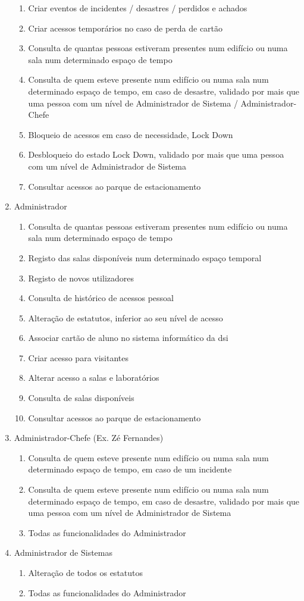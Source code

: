 \documentclass[a4paper]{report}
\begin{document}
\begin{enumerate}
\begin{enumerate}
    \item Criar eventos de incidentes / desastres / perdidos e achados
    \item Criar acessos temporários no caso de perda de cartão
	\item Consulta de quantas pessoas estiveram presentes num edifício ou numa sala num determinado espaço de tempo
    \item Consulta de quem esteve presente num edifício ou numa sala num determinado espaço de tempo, em caso de desastre, validado por mais que uma pessoa com um nível de Administrador de Sistema / Administrador-Chefe
    \item Bloqueio de acessos em caso de necessidade, Lock Down
    \item Desbloqueio do estado Lock Down, validado por mais que uma pessoa com um nível de Administrador de Sistema
    \item Consultar acessos ao parque de estacionamento
	\end{enumerate}
\item Administrador
	\begin{enumerate}
    \item Consulta de quantas pessoas estiveram presentes num edifício ou numa sala num determinado espaço de tempo
    \item Registo das salas disponíveis num determinado espaço temporal
    \item Registo de novos utilizadores
	\item Consulta de histórico de acessos pessoal
    \item Alteração de estatutos, inferior ao seu nível de acesso
    \item Associar cartão de aluno no sistema informático da dsi
    \item Criar acesso para visitantes
    \item Alterar acesso a salas e laboratórios
    \item Consulta de salas disponíveis
    \item Consultar acessos ao parque de estacionamento
    \end{enumerate}
\item Administrador-Chefe (Ex. Zé Fernandes)
	\begin{enumerate}
	\item Consulta de quem esteve presente num edifício ou numa sala num determinado espaço de tempo, em caso de um incidente
    \item Consulta de quem esteve presente num edifício ou numa sala num determinado espaço de tempo, em caso de desastre, validado por mais que uma pessoa com um nível de Administrador de Sistema
    \item Todas as funcionalidades do Administrador
	\end{enumerate}
\item Administrador de Sistemas
	\begin{enumerate}
    \item Alteração de todos os estatutos
    \item Todas as funcionalidades do Administrador
    \end{enumerate}
\end{enumerate}
\end{document}
